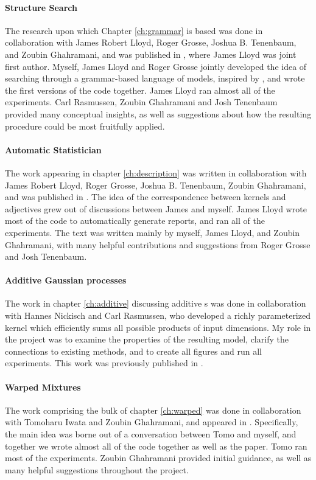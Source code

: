 \paragraph{Structure Search}
The research upon which Chapter \ref{ch:grammar} is based was done in collaboration with James Robert Lloyd, Roger Grosse, Joshua B. Tenenbaum, and Zoubin Ghahramani, and was published in \citep{DuvLloGroetal13}, where James Lloyd was joint first author.
Myself, James Lloyd and Roger Grosse jointly developed the idea of searching through a grammar-based language of \gp{} models, inspired by \citet{grosse2012exploiting}, and wrote the first versions of the code together.
James Lloyd ran almost all of the experiments.
 Carl Rasmussen, Zoubin Ghahramani and Josh Tenenbaum provided many conceptual insights, as well as suggestions about how the resulting procedure could be most fruitfully applied.

\paragraph{Automatic Statistician} The work appearing in chapter \ref{ch:description} was written in collaboration with James Robert Lloyd, Roger Grosse, Joshua B. Tenenbaum, Zoubin Ghahramani, and was published in \citep{LloDuvGroetal14}.
The idea of the correspondence between kernels and adjectives grew out of discussions between James and myself.
James Lloyd wrote most of the code to automatically generate reports, and ran all of the experiments.
The text was written mainly by myself, James Lloyd, and Zoubin Ghahramani, with many helpful contributions and suggestions from Roger Grosse and Josh Tenenbaum.

\paragraph{Additive Gaussian processes}
The work in chapter \ref{ch:additive} discussing additive \gp{}s was done in collaboration with Hannes Nickisch and Carl Rasmussen, who developed a richly parameterized kernel which efficiently sums all possible products of input dimensions.
My role in the project was to examine the properties of the resulting model, clarify the connections to existing methods, and to create all figures and run all experiments.
This work was previously published in \citep{duvenaud2011additive11}.

\paragraph{Warped Mixtures}
The work comprising the bulk of chapter \ref{ch:warped} was done in collaboration with Tomoharu Iwata and Zoubin Ghahramani, and appeared in \citep{IwaDuvGha12}.
Specifically, the main idea was borne out of a conversation between Tomo and myself, and together we wrote almost all of the code together as well as the paper.
Tomo ran most of the experiments.
Zoubin Ghahramani provided initial guidance, as well as many helpful suggestions throughout the project.


